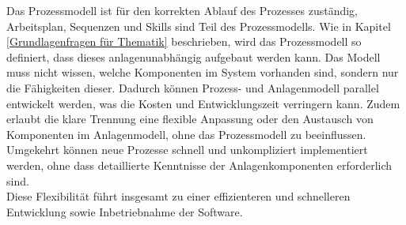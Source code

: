 Das Prozessmodell ist für den korrekten Ablauf des Prozesses zuständig, Arbeitsplan, Sequenzen und Skills sind Teil des Prozessmodells. Wie in Kapitel \ref{Grundlagenfragen für Thematik} beschrieben, wird das Prozessmodell so definiert, dass dieses anlagenunabhängig aufgebaut werden kann. Das  Modell muss nicht wissen, welche Komponenten im System vorhanden sind, sondern nur die Fähigkeiten dieser. Dadurch können Prozess- und Anlagenmodell parallel entwickelt werden, was die Kosten und Entwicklungszeit verringern kann. Zudem erlaubt die klare Trennung eine flexible Anpassung oder den Austausch von Komponenten im Anlagenmodell, ohne das Prozessmodell zu beeinflussen. Umgekehrt können neue Prozesse schnell und unkompliziert implementiert werden, ohne dass detaillierte Kenntnisse der Anlagenkomponenten erforderlich sind.
\\
Diese Flexibilität führt insgesamt zu einer effizienteren und schnelleren Entwicklung sowie Inbetriebnahme der Software.
